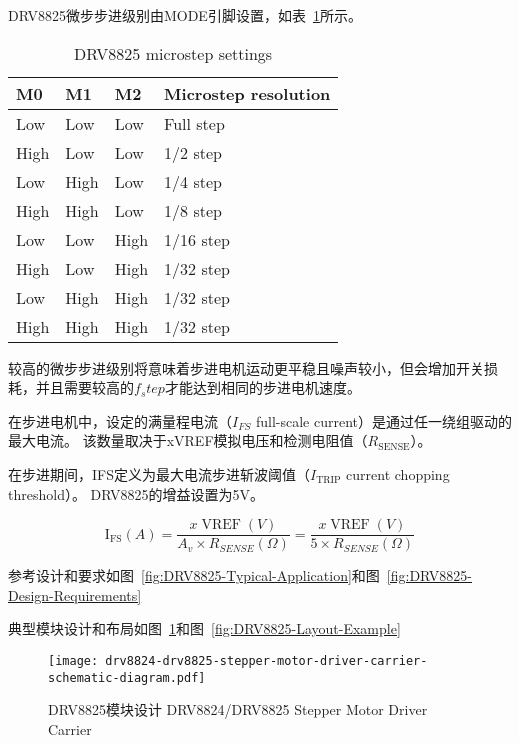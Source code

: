 DRV8825微步步进级别由MODE引脚设置，如表~\ref{tab:DRV8825-microstep-settings}所示。

\begin{table}[htbp]
    \centering
    \begin{tabular}{llll}
    \hline
    M0   & M1   & M2   & Microstep resolution \\ \hline
    Low  & Low  & Low  & Full step            \\ \hline
    High & Low  & Low  & 1/2 step             \\ \hline
    Low  & High & Low  & 1/4 step             \\ \hline
    High & High & Low  & 1/8 step             \\ \hline
    Low  & Low  & High & 1/16 step            \\ \hline
    High & Low  & High & 1/32 step            \\ \hline
    Low  & High & High & 1/32 step            \\ \hline
    High & High & High & 1/32 step            \\ \hline
    \end{tabular}
    \caption{DRV8825 microstep settings}
    \label{tab:DRV8825-microstep-settings}
\end{table}

较高的微步步进级别将意味着步进电机运动更平稳且噪声较小，但会增加开关损耗，并且需要较高的$f_step$才能达到相同的步进电机速度。

在步进电机中，设定的满量程电流（$I_{FS}$ full-scale current）是通过任一绕组驱动的最大电流。 该数量取决于xVREF模拟电压和检测电阻值（$R_{\text {SENSE}}$）。 

在步进期间，IFS定义为最大电流步进斩波阈值（$I_{\text {TRIP}}$ current chopping threshold）。 DRV8825的增益设置为5V。

\begin{equation}
    \operatorname{I_{FS}}(A)=\frac{x \operatorname{VREF}(V)}{A_{v} \times R_{S E N S E}(\Omega)}=\frac{x \operatorname{VREF}(V)}{5 \times R_{S E N S E}(\Omega)}
\end{equation}

参考设计和要求如图~\ref{fig:DRV8825-Typical-Application}和图~\ref{fig:DRV8825-Design-Requirements}

典型模块设计和布局如图~\ref{fig:DRV8825-stepper-motor-driver-carrier-schematic-diagram}和图~\ref{fig:DRV8825-Layout-Example}

\begin{figure}[htbp]
    \centering
    \texttt{[image: drv8824-drv8825-stepper-motor-driver-carrier-schematic-diagram.pdf]}
    \caption{DRV8825模块设计 DRV8824/DRV8825 Stepper Motor Driver Carrier}
    \label{fig:DRV8825-stepper-motor-driver-carrier-schematic-diagram}
\end{figure}

